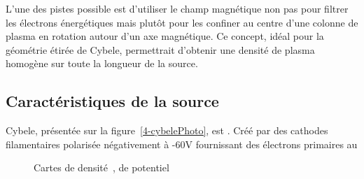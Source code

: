 \begin{refsection}
L'une des pistes possible est d'utiliser le champ magnétique non pas pour
filtrer les électrons énergétiques mais plutôt pour les confiner au centre
d'une colonne de plasma en rotation autour d'un axe magnétique. Ce concept,
idéal pour la géométrie étirée de Cybele, permettrait d'obtenir une densité de
plasma homogène sur toute la longueur de la source. 

\subsection{Caractéristiques de la source}

Cybele, présentée sur la figure~\ref{4-cybelePhoto}, est . Créé par des cathodes
filamentaires polarisée négativement à -60V fournissant des électrons primaires au 
\begin{figure}[htbp]
  \centering
    \caption{Cartes de densité~, de
    potentiel}
    \label{pandas}
\end{figure}	


\end{refsection}
